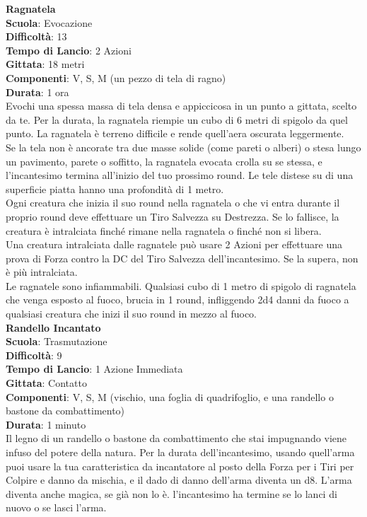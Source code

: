 \begin{multicols}{2}
\medskip\textbf{Ragnatela}\\
\textbf{Scuola}: Evocazione\\
\textbf{Difficoltà}:  13\\
\textbf{Tempo di Lancio}: 2 Azioni\\
\textbf{Gittata}: 18 metri\\
\textbf{Componenti}: V, S, M (un pezzo di tela di ragno)\\
\textbf{Durata}: 1 ora\\
Evochi una spessa massa di tela densa e appiccicosa in un punto a gittata, scelto da te. Per la durata, la ragnatela riempie un cubo di 6 metri di spigolo da quel punto. La ragnatela è terreno difficile e rende quell'aera oscurata leggermente.\\
Se la tela non è ancorate tra due masse solide (come pareti o alberi) o stesa lungo un pavimento, parete o soffitto, la ragnatela evocata crolla su se stessa, e l'incantesimo termina all'inizio del tuo prossimo round. Le tele distese su di una superficie piatta hanno una profondità di 1 metro.\\
Ogni creatura che inizia il suo round nella ragnatela o che vi entra durante il proprio round deve effettuare un Tiro Salvezza su Destrezza. Se lo fallisce, la creatura è intralciata finché rimane nella ragnatela o finché non si libera.\\
Una creatura intralciata dalle ragnatele può usare 2 Azioni per effettuare una prova di Forza contro la DC del Tiro Salvezza dell'incantesimo. Se la supera, non è più intralciata.\\
Le ragnatele sono infiammabili. Qualsiasi cubo di 1 metro di spigolo di ragnatela che venga esposto al fuoco, brucia in 1 round, infliggendo 2d4 danni da fuoco a qualsiasi creatura che inizi il suo round in mezzo al fuoco.\\

\medskip\textbf{Randello Incantato}\\
\textbf{Scuola}: Trasmutazione\\
\textbf{Difficoltà}:  9\\
\textbf{Tempo di Lancio}: 1 Azione Immediata\\
\textbf{Gittata}: Contatto\\
\textbf{Componenti}: V, S, M (vischio, una foglia di quadrifoglio, e una randello o bastone da combattimento)\\
\textbf{Durata}: 1 minuto\\
Il legno di un randello o bastone da combattimento che stai impugnando viene infuso del potere della natura. Per la durata dell'incantesimo, usando quell'arma puoi usare la tua caratteristica da incantatore al posto della Forza per i Tiri per Colpire e danno da mischia, e il dado di danno dell'arma diventa un d8. L’arma diventa anche magica, se già non lo è. l'incantesimo ha termine se lo lanci di nuovo o se lasci l’arma.


\end{multicols}
